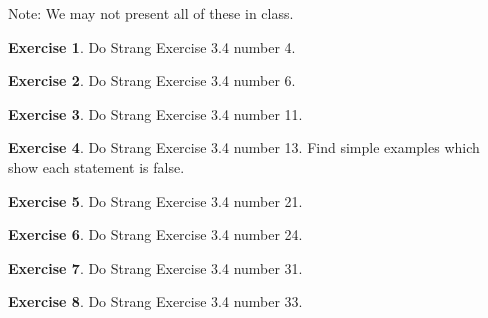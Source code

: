 \documentclass[11pt]{amsart}
\theoremstyle{definition}
\newtheorem{exercise}{Exercise}
\begin{document}
Note: We may not present all of these in class.

\begin{exercise} Do Strang Exercise 3.4 number 4. \end{exercise}
\begin{exercise} Do Strang Exercise 3.4 number 6. \end{exercise}
\begin{exercise} Do Strang Exercise 3.4 number 11. \end{exercise}
\begin{exercise} Do Strang Exercise 3.4 number 13. Find simple examples which show each statement is false. \end{exercise}
\begin{exercise} Do Strang Exercise 3.4 number 21. \end{exercise}
\begin{exercise} Do Strang Exercise 3.4 number 24. \end{exercise}
\begin{exercise} Do Strang Exercise 3.4 number 31. \end{exercise}
\begin{exercise} Do Strang Exercise 3.4 number 33. \end{exercise}
\end{document}
